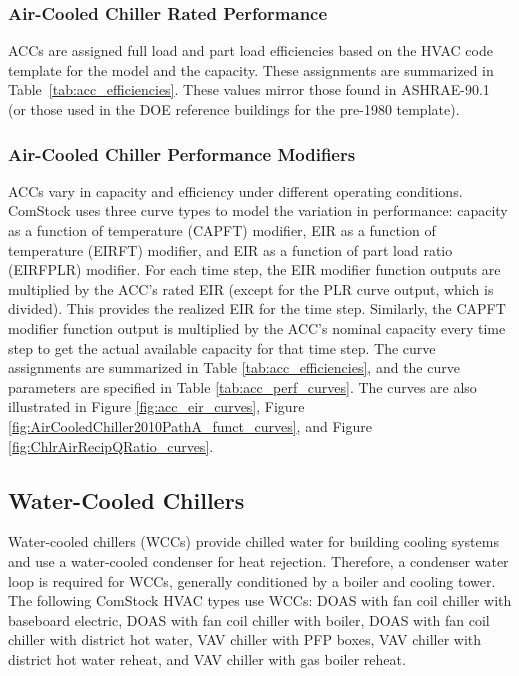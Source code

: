 \subsubsection{Air-Cooled Chiller Rated Performance}

ACCs are assigned full load and part load efficiencies based on the HVAC code template for the model and the capacity. These assignments are summarized in Table~\ref{tab:acc_efficiencies}. These values mirror those found in ASHRAE-90.1 (or those used in the DOE reference buildings for the pre-1980 template).



\subsubsection{Air-Cooled Chiller Performance Modifiers}

ACCs vary in capacity and efficiency under different operating conditions. ComStock uses three curve types to model the variation in performance: capacity as a function of temperature (CAPFT) modifier, EIR as a function of temperature (EIRFT) modifier, and EIR as a function of part load ratio (EIRFPLR) modifier. For each time step, the EIR modifier function outputs are multiplied by the ACC's rated EIR (except for the PLR curve output, which is divided). This provides the realized EIR for the time step. Similarly, the CAPFT modifier function output is multiplied by the ACC's nominal capacity every time step to get the actual available capacity for that time step. The curve assignments are summarized in Table \ref{tab:acc_efficiencies}, and the curve parameters are specified in Table \ref{tab:acc_perf_curves}. The curves are also illustrated in Figure \ref{fig:acc_eir_curves}, Figure \ref{fig:AirCooledChiller2010PathA_funct_curves}, and Figure \ref{fig:ChlrAirRecipQRatio_curves}.


\subsection{Water-Cooled Chillers}

Water-cooled chillers (WCCs) provide chilled water for building cooling systems and use a water-cooled condenser for heat rejection. Therefore, a condenser water loop is required for WCCs, generally conditioned by a boiler and cooling tower. The following ComStock HVAC types use WCCs: DOAS with fan coil chiller with baseboard electric, DOAS with fan coil chiller with boiler, DOAS with fan coil chiller with district hot water, VAV chiller with PFP boxes, VAV chiller with district hot water reheat, and VAV chiller with gas boiler reheat.

